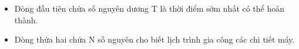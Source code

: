 \begin{itemize}
	\item     Dòng đầu tiên chứa số nguyên dương T là thời điểm sớm nhất có thể hoàn thành.   
	\item     Dòng thứa hai chứa N số nguyên cho biết lịch trình gia công các chi tiết máy.   
\end{itemize}